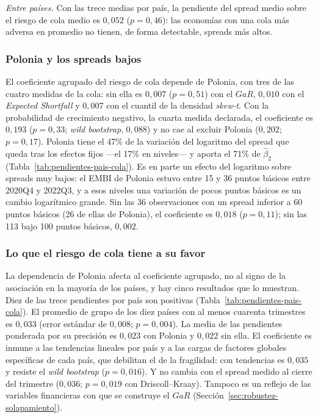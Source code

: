 \emph{Entre países.} Con las trece medias por país, la pendiente del spread medio sobre el riesgo de cola medio es $0{,}052$ ($p=0{,}46$): las economías con una cola más adversa en promedio no tienen, de forma detectable, spreads más altos.

\subsubsection{Polonia y los spreads bajos}

El coeficiente agrupado del riesgo de cola depende de Polonia, con tres de las cuatro medidas de la cola: sin ella es $0{,}007$ ($p=0{,}51$) con el $GaR$, $0{,}010$ con el \textit{Expected Shortfall} y $0{,}007$ con el cuantil de la densidad \textit{skew-t}. Con la probabilidad de crecimiento negativo, la cuarta medida declarada, el coeficiente es $0{,}193$ ($p=0{,}33$; \textit{wild bootstrap}, $0{,}088$) y no cae al excluir Polonia ($0{,}202$; $p=0{,}17$). Polonia tiene el 47\% de la variación del logaritmo del spread que queda tras los efectos fijos ---el 17\% en niveles--- y aporta el 71\% de $\hat\beta_2$ (Tabla~\ref{tab:pendientes-pais-cola}). Es en parte un efecto del logaritmo sobre spreads muy bajos: el EMBI de Polonia estuvo entre 15 y 36 puntos básicos entre 2020Q4 y 2022Q3, y a esos niveles una variación de pocos puntos básicos es un cambio logarítmico grande. Sin las 36 observaciones con un spread inferior a 60 puntos básicos (26 de ellas de Polonia), el coeficiente es $0{,}018$ ($p=0{,}11$); sin las 113 bajo 100 puntos básicos, $0{,}002$.

\subsubsection{Lo que el riesgo de cola tiene a su favor}

La dependencia de Polonia afecta al coeficiente agrupado, no al signo de la asociación en la mayoría de los países, y hay cinco resultados que lo muestran. Diez de las trece pendientes por país son positivas (Tabla~\ref{tab:pendientes-pais-cola}). El promedio de grupo de los diez países con al menos cuarenta trimestres es $0{,}033$ (error estándar de $0{,}008$; $p=0{,}004$). La media de las pendientes ponderada por su precisión es $0{,}023$ con Polonia y $0{,}022$ sin ella. El coeficiente es inmune a las tendencias lineales por país y a las cargas de factores globales específicas de cada país, que debilitan el de la fragilidad: con tendencias es $0{,}035$ y resiste el \textit{wild bootstrap} ($p=0{,}016$). Y no cambia con el spread medido al cierre del trimestre ($0{,}036$; $p=0{,}019$ con Driscoll--Kraay). Tampoco es un reflejo de las variables financieras con que se construye el $GaR$ (Sección~\ref{sec:robustez-solapamiento}).

